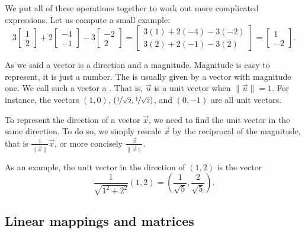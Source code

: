 We put all of these operations together to work out more complicated expressions.
Let us compute a small example:
\begin{equation*}
3
\begin{bmatrix}
1 \\ 2
\end{bmatrix}
+
2
\begin{bmatrix}
-4 \\ -1
\end{bmatrix} 
-
3
\begin{bmatrix}
-2 \\ 2
\end{bmatrix} 
=
\begin{bmatrix}
3(1)+2(-4)-3(-2) \\ 3(2)+2(-1)-3(2)
\end{bmatrix}
=
\begin{bmatrix}
1 \\ -2
\end{bmatrix}
.
\end{equation*}

\medskip

As we said a vector is a direction and a magnitude.  Magnitude is easy to
represent, it is just a number.  The \emph{} is usually
given by a vector with magnitude one.  We call such a vector a
\emph{}.  That is, $\vec{u}$ is a unit vector when
$\lVert \vec{u} \rVert = 1$.  For instance, the vectors $(1,0)$,
$(\nicefrac{1}{\sqrt{2}},\nicefrac{1}{\sqrt{2}})$, and $(0,-1)$ are all
unit vectors.

To represent the direction of a vector $\vec{x}$, we need to find the 
unit vector in the same direction.  To do so, we simply rescale
$\vec{x}$ by the reciprocal of the magnitude, that is
$\frac{1}{\lVert \vec{x} \rVert} \vec{x}$, or more concisely
$\frac{\vec{x}}{\lVert \vec{x} \rVert}$.

As an example, the unit vector in the direction of $(1,2)$ is the vector
\begin{equation*}
\frac{1}{\sqrt{1^2+2^2}} (1,2)
=
\left( \frac{1}{\sqrt{5}}, \frac{2}{\sqrt{5}} \right) .
\end{equation*}

\subsection{Linear mappings and matrices}

